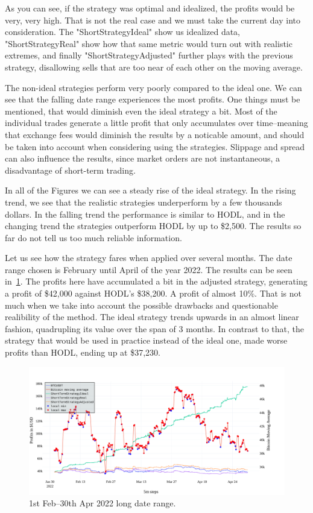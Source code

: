 As you can see, if the strategy was optimal and idealized, the profits would be very, very high. That is not the real case and we must take the current day into consideration. The "ShortStrategyIdeal" show us idealized data, "ShortStrategyReal" show how that same metric would turn out with realistic extremes, and finally "ShortStrategyAdjusted" further plays with the previous strategy, disallowing sells that are too near of each other on the moving average.

The non-ideal strategies perform very poorly compared to the ideal one. We can see that the falling date range experiences the most profits. One things must be mentioned, that would diminish even the ideal strategy a bit. Most of the individual trades generate a little profit that only accumulates over time--meaning that exchange fees would diminish the results by a noticable amount, and should be taken into account when considering using the strategies. Slippage and spread can also influence the results, since market orders are not instantaneous, a disadvantage of short-term trading.

In all of the Figures we can see a steady rise of the ideal strategy. In the rising trend, we see that the realistic strategies underperform by a few thousands dollars. In the falling trend the performance is similar to HODL, and in the changing trend the strategies outperform HODL by up to \$2,500. The results so far do not tell us too much reliable information.

Let us see how the strategy fares when applied over several months. The date range chosen is February until April of the year 2022. The results can be seen in~\ref{figure-short-term-long}. The profits here have accumulated a bit in the adjusted strategy, generating a profit of \$42,000 against HODL's \$38,200. A profit of almost 10\%. That is not much when we take into account the possible drawbacks and questionable realibility of the method. The ideal strategy trends upwards in an almost linear fashion, quadrupling its value over the span of 3 months. In contrast to that, the strategy that would be used in practice instead of the ideal one, made worse profits than HODL, ending up at \$37,230.

\begin{figure}[!t]
    \centering
    \includegraphics[width=\columnwidth]{figures/short-term-long.pdf}
    \caption{1st Feb--30th Apr 2022 long date range.}
    \label{figure-short-term-long}
\end{figure}

